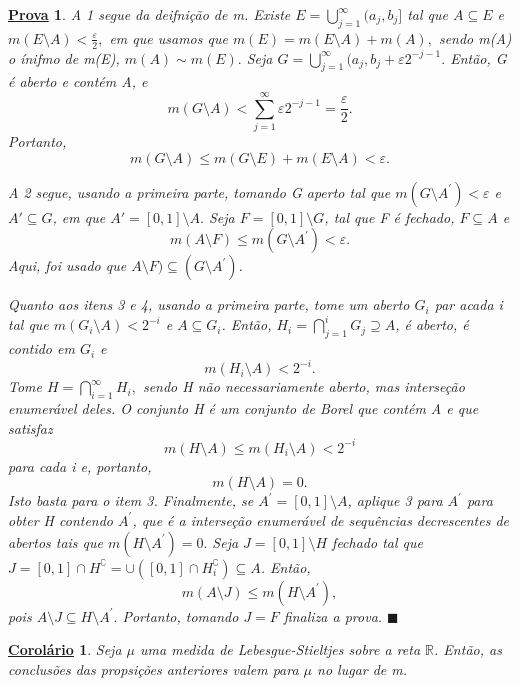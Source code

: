 \documentclass{article}
\newtheorem*{proof*}{\underline{Prova}}
\newtheorem*{crl*}{\underline{Corolário}}
\renewcommand\qedsymbol{$\blacksquare$}
\begin{document}
\begin{proof*}
  A 1 segue da deifnição de m. Existe \(E = \bigcup_{j=1}^{\infty}(a_{j}, b_{j}]\) tal que \(A\subseteq E\) e \(m(E\setminus{A}) < \frac{\varepsilon }{2},\) em que usamos que \(m(E) = m(E\setminus{A}) + m(A),\) sendo m(A) o ínifmo de m(E), 
  \(m(A)\sim m(E).\) Seja \(G = \bigcup_{j=1}^{\infty}(a_{j}, b_{j}+\varepsilon 2^{-j-1}.\) Então, G é aberto e contém A, e 
    \[
      m(G\setminus{A}) < \sum\limits_{j=1}^{\infty}\varepsilon 2^{-j-1} = \frac{\varepsilon }{2}.
    \]
  Portanto, 
    \[
      m(G\setminus{A})\leq m(G\setminus{E}) + m(E\setminus{A}) < \varepsilon .
    \]

    A 2 segue, usando a primeira parte, tomando G aperto tal que \(m(G\setminus{A}^{\prime}) < \varepsilon \) e \(A\prime \subseteq G\), em que \(A\prime = [0, 1]\setminus{A}.\) Seja \(F = [0, 1]\setminus{G}\), tal que F é fechado, \(F\subseteq A\)
e 
  \[
    m(A\setminus{F}) \leq m(G\setminus{A}^{\prime}) < \varepsilon .
  \]
  Aqui, foi usado que \(A\setminus{F})\subseteq (G\setminus{A}^{\prime})\).

  Quanto aos itens 3 e 4, usando a primeira parte, tome um aberto \(G_{i}\) par acada i tal que \(m(G_{i}\setminus{A}) < 2^{-i}\) e \(A\subseteq G_{i}\). Então, \(H_{i} = \bigcap_{j=1}^{i}G_{j}\supseteq A\), é aberto, é contido em \(G_{i}\) e 
    \[
      m(H_{i}\setminus{A}) < 2^{-i}.
    \]
  Tome \(H = \bigcap_{i=1}^{\infty}H_{i},\) sendo H não necessariamente aberto, mas interseção enumerável deles. O conjunto H é um conjunto de Borel que contém A e que satisfaz 
    \[
      m(H\setminus{A}) \leq m(H_{i}\setminus{A}) < 2^{-i}
    \]
  para cada i e, portanto, 
    \[
      m(H\setminus{A}) = 0.
    \]
    Isto basta para o item 3. Finalmente, se \(A^{\prime} = [0, 1]\setminus{A}\), aplique 3 para \(A^{\prime}\) para obter H contendo \(A^{\prime}\), que é a interseção enumerável de sequências decrescentes de abertos tais que 
   \(m(H\setminus{A^{\prime}}) = 0.\) Seja \(J = [0, 1]\setminus{H}\) fechado tal que \(J = [0, 1]\cap H ^{\complement} = \cup ([0,1]\cap H_{i}^{\complement}) \subseteq A\). Então, 
     \[
       m(A\setminus{J}) \leq m(H\setminus{A^{\prime}}),
     \]
     pois \(A\setminus{J} \subseteq H\setminus{A^{\prime}.}\) Portanto, tomando \(J = F\) finaliza a prova. \qedsymbol
\end{proof*}
\begin{crl*}
  Seja \(\mu \) uma medida de Lebesgue-Stieltjes sobre a reta \(\mathbb{R}\). Então, as conclusões das propsições anteriores valem para \(\mu \) no lugar de m.
\end{crl*}
\end{document}
